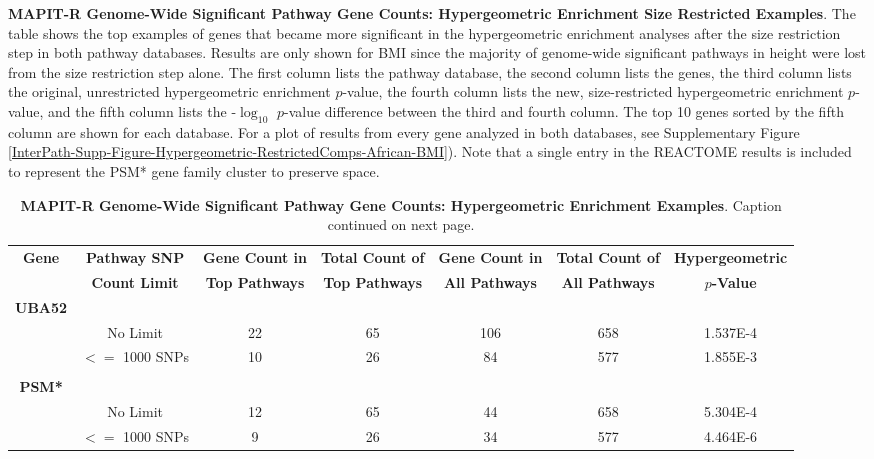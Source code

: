 \documentclass[12pt, a4paper]{article}
\begin{document}
\begin{table}[ht]
\caption[TBD]{\textbf{MAPIT-R Genome-Wide Significant Pathway Gene Counts: Hypergeometric Enrichment Size Restricted Examples}. The table shows the top examples of genes that became more significant in the hypergeometric enrichment analyses after the size restriction step in both pathway databases. Results are only shown for BMI since the majority of genome-wide significant pathways in height were lost from the size restriction step alone. The first column lists the pathway database, the second column lists the genes, the third column lists the original, unrestricted hypergeometric enrichment $p$-value, the fourth column lists the new, size-restricted hypergeometric enrichment $p$-value, and the fifth column lists the -$\log_{10}$ $p$-value difference between the third and fourth column. The top 10 genes sorted by the fifth column are shown for each database. For a plot of results from every gene analyzed in both databases, see Supplementary Figure \ref{InterPath-Supp-Figure-Hypergeometric-RestrictedComps-African-BMI}). Note that a single entry in the REACTOME results is included to represent the PSM* gene family cluster to preserve space.}
\label{InterPath-Supp-Table-Hypergeometric-RestrictedComps-African-BMI-TopExamples}
\end{table}
\clearpage
\setlength{\footskip}{1cm}

\begin{landscape}
\begin{table}[ht]
\centering
\hspace*{-1.5cm}
\begin{tabular}{ccccccc}
  \hline
  \textbf{Gene} & \textbf{Pathway SNP} & \textbf{Gene Count in} & \textbf{Total Count of} & \textbf{Gene Count in} & \textbf{Total Count of} & \textbf{Hypergeometric} \\
   & \textbf{Count Limit} & \textbf{Top Pathways} & \textbf{Top Pathways} & \textbf{All Pathways} & \textbf{All Pathways} & \textbf{$p$-Value} \\
  \hline
 \textbf{UBA52} & & & & & & \\
 & No Limit & 22 & 65 & 106 & 658 & 1.537E-4 \\
 & $<=$ 1000 SNPs & 10 & 26 & 84 & 577 & 1.855E-3 \\
\\
 \textbf{PSM*} & & & & & & \\
 & No Limit & 12 & 65 & 44 & 658 & 5.304E-4 \\
 & $<=$ 1000 SNPs & 9 & 26 & 34 & 577 & 4.464E-6 \\
   \hline
\end{tabular}
\caption[TBD]{\textbf{MAPIT-R Genome-Wide Significant Pathway Gene Counts: Hypergeometric Enrichment Examples}. Caption continued on next page.}
\label{InterPath-Supp-Tables-AllPops-TopGeneCount-HypergeometricTests}
\end{table}
\end{landscape}
\clearpage
\end{document}
